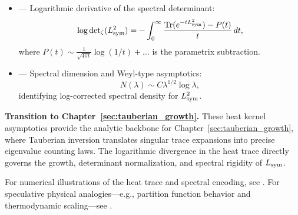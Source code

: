 \begin{itemize}
  \item {} — Logarithmic derivative of the spectral determinant:
  \[
  \log \det\nolimits_{\zeta}(L_{\mathrm{sym}}^2)
  = -\int_0^\infty \frac{\operatorname{Tr}(e^{-t L_{\mathrm{sym}}^2}) - P(t)}{t} \, dt,
  \]
  where \( P(t) \sim \frac{1}{\sqrt{4\pi t}} \log(1/t) + \dots \) is the parametrix subtraction.

  \item {} — Spectral dimension and Weyl-type asymptotics:
  \[
  N(\lambda) \sim C \lambda^{1/2} \log \lambda,
  \]
  identifying log-corrected spectral density for \( L_{\mathrm{sym}}^2 \).
\end{itemize}

\medskip

\noindent\textbf{Transition to Chapter~\ref{sec:tauberian_growth}.}  
These heat kernel asymptotics provide the analytic backbone for Chapter~\ref{sec:tauberian_growth}, where Tauberian inversion translates singular trace expansions into precise eigenvalue counting laws. The logarithmic divergence in the heat trace directly governs the growth, determinant normalization, and spectral rigidity of \( L_{\mathrm{sym}} \).

\medskip

\noindent
For numerical illustrations of the heat trace and spectral encoding, see . For speculative physical analogies—e.g., partition function behavior and thermodynamic scaling—see .
